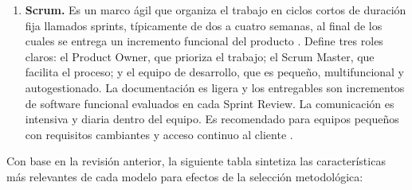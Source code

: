 \documentclass{article}
\begin{document}
\begin{enumerate}
     \item \textbf{Scrum.} Es un marco ágil que organiza el trabajo en ciclos cortos de duración fija llamados sprints, típicamente de dos a cuatro semanas, al final de los cuales se entrega un incremento funcional del producto \cite{schwaber2020}. Define tres roles claros: el Product Owner, que prioriza el trabajo; el Scrum Master, que facilita el proceso; y el equipo de desarrollo, que es pequeño, multifuncional y autogestionado. La documentación es ligera y los entregables son incrementos de software funcional evaluados en cada Sprint Review. La comunicación es intensiva y diaria dentro del equipo. Es recomendado para equipos pequeños  con requisitos cambiantes y acceso continuo al cliente \cite{pressman2015}.
\end{enumerate}

Con base en la revisión anterior, la siguiente tabla sintetiza las características más relevantes de cada modelo para efectos de la selección metodológica:
\end{document}
